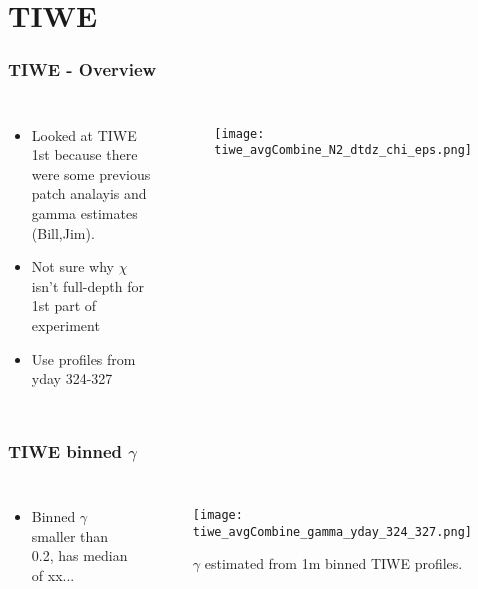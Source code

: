 \documentclass{beamer}
\begin{document}
\section{TIWE}


\begin{frame}
 \frametitle{TIWE - Overview}

\begin{columns}
\begin{itemize}
\item Looked at TIWE 1st because there were some previous patch analayis and gamma estimates (Bill,Jim).
\item Not sure why $\chi$ isn't full-depth for 1st part of experiment
\item Use profiles from yday 324-327
\end{itemize}

\begin{figure}[htbp]
\begin{center}
\texttt{[image: tiwe\_avgCombine\_N2\_dtdz\_chi\_eps.png]}
\caption{}
\label{default}
\end{center}
\end{figure}

\end{columns}


\end{frame}


\begin{frame}
 \frametitle{TIWE binned $\gamma$}

\begin{columns}
\begin{itemize}
\item Binned $\gamma$ smaller than 0.2, has median of xx...
\end{itemize}

\begin{figure}[htbp]
\begin{center}
\texttt{[image: tiwe\_avgCombine\_gamma\_yday\_324\_327.png]}
\caption{$\gamma$ estimated from 1m binned TIWE profiles.}
\label{default}
\end{center}
\end{figure}

\end{columns}


\end{frame}
\end{document}
